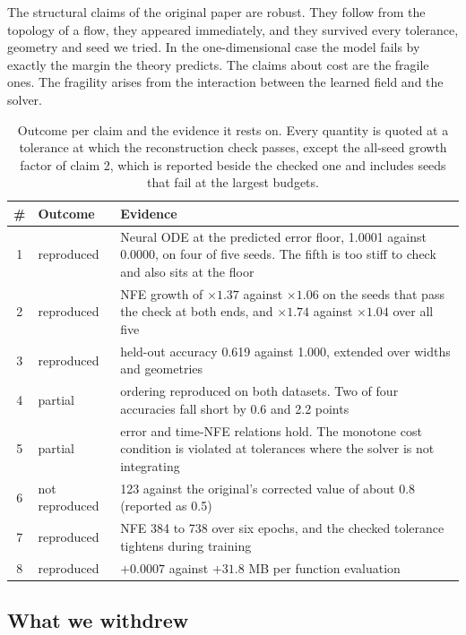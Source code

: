 The structural claims of the original paper are robust. They follow from the topology of a
flow, they appeared immediately, and they survived every tolerance, geometry and seed we tried.
In the one-dimensional case the model fails by exactly the margin the theory predicts. The
claims about cost are the fragile ones. The fragility arises from the interaction between the learned field
and the solver.

\begin{table}[h]
  \centering
  \small
  \caption{Outcome per claim and the evidence it rests on. Every quantity is quoted at a
           tolerance at which the reconstruction check passes, except the all-seed growth
           factor of claim 2, which is reported beside the checked one and includes seeds that
           fail at the largest budgets.}
  \label{tab:summary}
  \begin{tabularx}{\linewidth}{@{}clX@{}}
    \toprule
    \# & Outcome & Evidence \\
    \midrule
    1 & reproduced & Neural ODE at the predicted error floor, 1.0001 against 0.0000, on four of
        five seeds. The fifth is too stiff to check and also sits at the floor \\
    2 & reproduced & NFE growth of $\times1.37$ against $\times1.06$ on the seeds that
        pass the check at both ends, and $\times1.74$ against $\times1.04$ over all five \\
    3 & reproduced & held-out accuracy 0.619 against 1.000, extended over widths and
        geometries \\
    4 & partial & ordering reproduced on both datasets. Two of four accuracies fall short by
        0.6 and 2.2 points \\
    5 & partial & error and time-NFE relations hold. The monotone cost condition is violated
        at tolerances where the solver is not integrating \\
    6 & not reproduced & 123 against the original's corrected value of about 0.8
        (reported as 0.5) \\
    7 & reproduced & NFE 384 to 738 over six epochs, and the checked tolerance tightens during
        training \\
    8 & reproduced & $+0.0007$ against $+31.8$ MB per function evaluation \\
    \bottomrule
  \end{tabularx}
\end{table}

\subsection{What we withdrew}
\label{sec:withdrawn}

